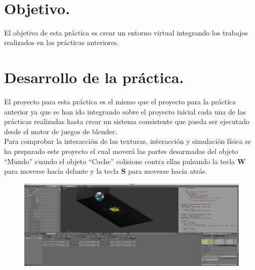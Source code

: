 \documentclass[10pt]{article}
\begin{document}
\begin{center}
 		\\																		%
\vspace{2cm} 																				
\begin{center}																					

 			\end{center}												  						
\end{center}							 											
																					
\newpage																		

\tableofcontents 

\newpage

\section{Objetivo.}
El objetivo de esta práctica es crear un entorno virtual integrando los trabajos realizados en las prácticas anteriores. \\


\section{Desarrollo de la práctica.}
El proyecto para esta práctica es el mismo que el proyecto para la práctica anterior ya que se han ido integrando sobre el proyecto inicial cada una de las prácticas realizadas hasta crear un sistema consistente que pueda ser ejecutado desde el motor de juegos de blender.\\

Para comprobar la interacción de las texturas, interacción y simulación física se ha preparado este proyecto el cual moverá las partes desarmadas del objeto ``Mundo'' cuando el objeto ``Coche'' colisione contra ellas pulsando la tecla \textbf{W} para moverse hacia delante y la tecla \textbf{S} para moverse hacia atrás. \\

\begin{figure}[H]
	\begin{center}
	 		\includegraphics[width = 1.00\textwidth]{Imagenes/p6-img1}
	\end{center} 
\end{figure}
\end{document}
